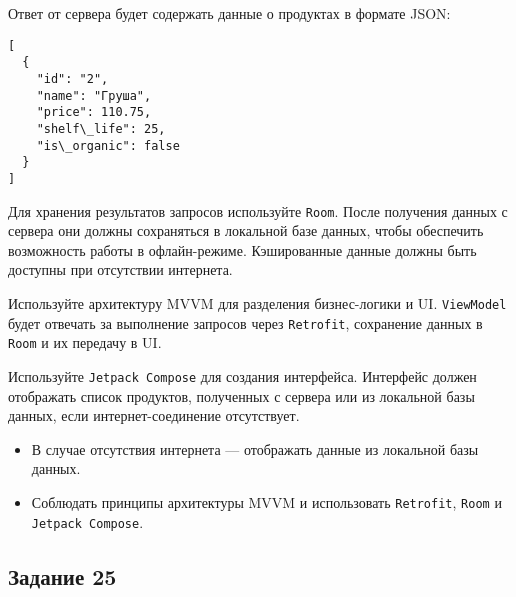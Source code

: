\documentclass[a4paper,12pt]{article}
\begin{document}
Ответ от сервера будет содержать данные о продуктах в формате JSON:

\begin{verbatim}
[
  {
    "id": "2",
    "name": "Груша",
    "price": 110.75,
    "shelf\_life": 25,
    "is\_organic": false
  }
]
\end{verbatim}

Для хранения результатов запросов используйте \texttt{Room}. После получения данных с сервера они должны сохраняться в локальной базе данных, чтобы обеспечить возможность работы в офлайн-режиме. Кэшированные данные должны быть доступны при отсутствии интернета.

Используйте архитектуру MVVM для разделения бизнес-логики и UI. \texttt{ViewModel} будет отвечать за выполнение запросов через \texttt{Retrofit}, сохранение данных в \texttt{Room} и их передачу в UI.

Используйте \texttt{Jetpack Compose} для создания интерфейса. Интерфейс должен отображать список продуктов, полученных с сервера или из локальной базы данных, если интернет-соединение отсутствует.

\begin{itemize}
  \item В случае отсутствия интернета — отображать данные из локальной базы данных.
  \item Соблюдать принципы архитектуры MVVM и использовать \texttt{Retrofit}, \texttt{Room} и \texttt{Jetpack Compose}.
\end{itemize}

\subsection*{Задание 25}
\end{document}
